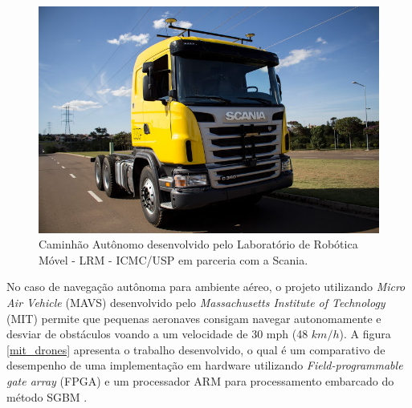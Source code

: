 \begin{figure}[H]
 	\centering
 	\includegraphics[scale=0.40]{./Resources/caminhao_autonomo.jpg}
 	\caption{Caminhão Autônomo desenvolvido pelo Laboratório de Robótica Móvel - LRM - ICMC/USP em parceria com a Scania.}
 	\label{caminhao_autonomo}
\end{figure}

No caso de navegação autônoma para ambiente aéreo, o projeto utilizando \textit{Micro Air Vehicle} (MAVS) desenvolvido pelo \textit{Massachusetts Institute of Technology} (MIT) permite que pequenas aeronaves consigam navegar autonomamente e desviar de obstáculos voando a um velocidade de 30 mph (48 $km/h$). A figura \ref{mit_drones} apresenta o trabalho desenvolvido, o qual é um comparativo de desempenho de uma implementação em hardware utilizando \textit{Field-programmable gate array} (FPGA) e um processador ARM para processamento embarcado do método SGBM \cite{BarryMIT}.

